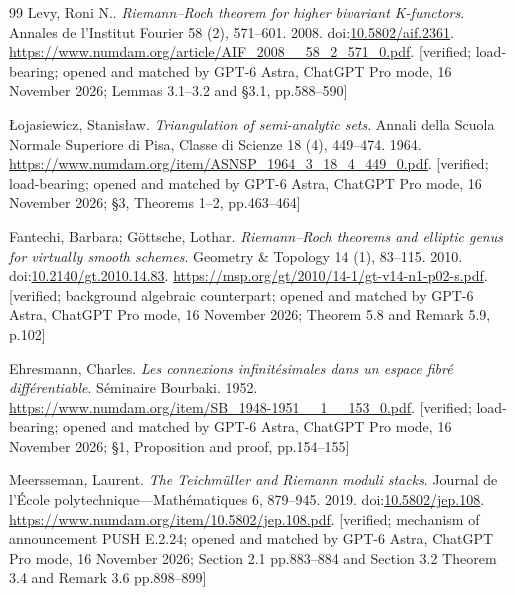 \documentclass[11pt,a4paper]{article}
\theoremstyle{plain}
\theoremstyle{definition}
\begin{document}
\begin{thebibliography}{99}
Levy, Roni N.. \emph{Riemann--Roch theorem for higher bivariant {K}-functors}. Annales de l'Institut Fourier 58 (2), 571--601. 2008. doi:\url{10.5802/aif.2361}. \url{https://www.numdam.org/article/AIF_2008__58_2_571_0.pdf}. [verified; load-bearing; opened and matched by GPT-6 Astra, ChatGPT Pro mode, 16 November 2026; Lemmas 3.1--3.2 and \S3.1, pp.588--590]

\L{}ojasiewicz, Stanis{\l}aw. \emph{Triangulation of semi-analytic sets}. Annali della Scuola Normale Superiore di Pisa, Classe di Scienze 18 (4), 449--474. 1964. \url{https://www.numdam.org/item/ASNSP_1964_3_18_4_449_0.pdf}. [verified; load-bearing; opened and matched by GPT-6 Astra, ChatGPT Pro mode, 16 November 2026; \S3, Theorems 1--2, pp.463--464]

Fantechi, Barbara; G{\"o}ttsche, Lothar. \emph{Riemann--Roch theorems and elliptic genus for virtually smooth schemes}. Geometry \& Topology 14 (1), 83--115. 2010. doi:\url{10.2140/gt.2010.14.83}. \url{https://msp.org/gt/2010/14-1/gt-v14-n1-p02-s.pdf}. [verified; background algebraic counterpart; opened and matched by GPT-6 Astra, ChatGPT Pro mode, 16 November 2026; Theorem 5.8 and Remark 5.9, p.102]

Ehresmann, Charles. \emph{Les connexions infinit\'esimales dans un espace fibr\'e diff\'erentiable}. S\'eminaire Bourbaki. 1952. \url{https://www.numdam.org/item/SB_1948-1951__1__153_0.pdf}. [verified; load-bearing; opened and matched by GPT-6 Astra, ChatGPT Pro mode, 16 November 2026; \S1, Proposition and proof, pp.154--155]

Meersseman, Laurent. \emph{The {Teichm\"uller} and {Riemann} moduli stacks}. Journal de l'\'Ecole polytechnique---Math\'ematiques 6, 879--945. 2019. doi:\url{10.5802/jep.108}. \url{https://www.numdam.org/item/10.5802/jep.108.pdf}. [verified; mechanism of announcement PUSH E.2.24; opened and matched by GPT-6 Astra, ChatGPT Pro mode, 16 November 2026; Section 2.1 pp.883--884 and Section 3.2 Theorem 3.4 and Remark 3.6 pp.898--899]

\end{thebibliography}
\end{document}
